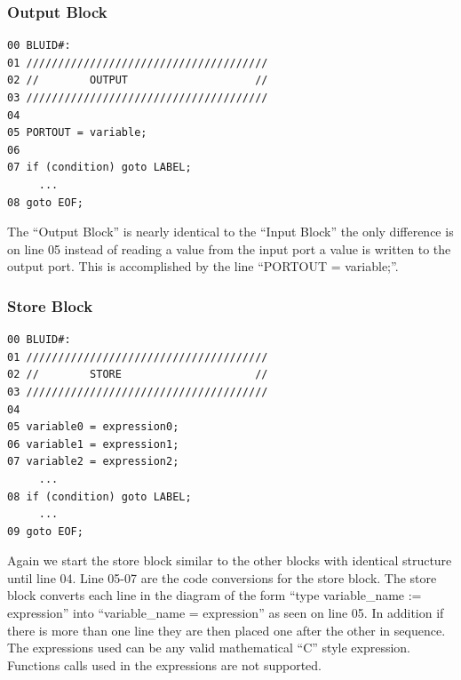 \subsubsection{Output Block}
\label{def:cmpoutputblock}
\begin{lstlisting}[frame=single]
00 BLUID#:
01 //////////////////////////////////////
02 //        OUTPUT                    //
03 //////////////////////////////////////
04
05 PORTOUT = variable;
06 
07 if (condition) goto LABEL;
     ...
08 goto EOF;
\end{lstlisting}

The ``Output Block'' is nearly identical to the ``Input Block'' 
the only difference is on line 05 instead of reading a value from 
the input port a value is written to the output port. This is 
accomplished by the line ``PORTOUT = variable;''.

\subsubsection{Store Block}
\label{def:cmpstoreblock}
\begin{lstlisting}[frame=single]
00 BLUID#:
01 //////////////////////////////////////
02 //        STORE                     //
03 //////////////////////////////////////
04
05 variable0 = expression0;
06 variable1 = expression1;
07 variable2 = expression2;
     ...
08 if (condition) goto LABEL;
     ...
09 goto EOF;
\end{lstlisting}

Again we start the store block similar to the other blocks with 
identical structure until line 04. Line 05-07 are the code conversions 
for the store block. The store block converts each line in the diagram 
of the form ``type variable\_name := expression'' into ``variable\_name = expression'' 
as seen on line 05. In addition if there is more than one line they 
are then placed one after the other in sequence. The expressions used can be any 
valid mathematical ``C'' style expression. Functions calls used in the 
expressions are not supported.